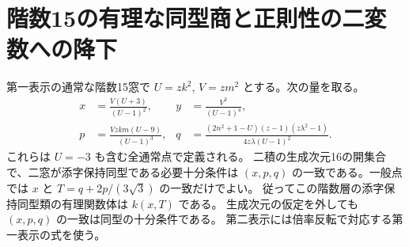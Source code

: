 \section{階数15の有理な同型商と正則性の二変数への降下}
\label{sec:rank-fifteen-rational-quotient}
\begin{theorem}\label{thm:rank-fifteen-rational-quotient}
第一表示の通常な階数15窓で $U=zk^2$, $V=zm^2$ とする。次の量を取る。
\[
\begin{aligned}
 x&=\frac{V(U+3)}{(U-1)^2}, &y&=\frac{V^3}{(U-1)^4},\\
 p&=\frac{Vzkm(U-9)}{(U-1)^3},&
 q&=\frac{(2n^2+1-U)(z-1)(z\lambda^2-1)}{4z\lambda(U-1)^2}.
\end{aligned}
\]
これらは $U=-3$ も含む全通常点で定義される。
二積の生成次元16の開集合で、二窓が添字保持同型である必要十分条件は
$(x,p,q)$ の一致である。一般点では $x$ と $T=q+2p/(3\sqrt3)$ の一致だけでよい。
従ってこの階数層の添字保持同型類の有理関数体は $k(x,T)$ である。
生成次元の仮定を外しても $(x,p,q)$ の一致は同型の十分条件である。
第二表示には倍率反転で対応する第一表示の式を使う。
\end{theorem}
